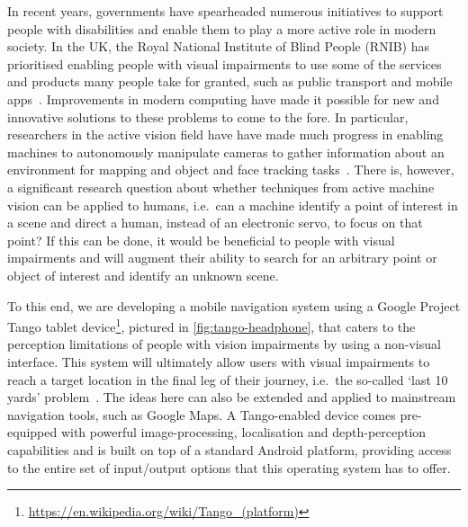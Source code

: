 \documentclass{llncs}
\begin{document}
In recent years, governments have spearheaded numerous initiatives to support people with disabilities and enable them to play a more active role in modern society.
In the UK, the Royal National Institute of Blind People (RNIB) has prioritised enabling people with visual impairments to use some of the services and products many people take for granted, such as public transport and mobile apps~\cite{rnib-objectives}.
Improvements in modern computing have made it possible for new and innovative solutions to these problems to come to the fore.
In particular, researchers in the active vision field have have made much progress in enabling machines to autonomously manipulate cameras to gather information about an environment for mapping and object and face tracking tasks~\cite{bajcsy2018revisiting}.
There is, however, a significant research question about whether techniques from active machine vision can be applied to humans, i.e.\ can a machine identify a point of interest in a scene and direct a human, instead of an electronic servo, to focus on that point?
If this can be done, it would be beneficial to people with visual impairments and will augment their ability to search for an arbitrary point or object of interest and identify an unknown scene. 

To this end, we are developing a mobile navigation system using a Google Project Tango tablet device\footnote{\url{https://en.wikipedia.org/wiki/Tango\_(platform)}}, pictured in \cref{fig:tango-headphone}, that caters to the perception limitations of people with vision impairments by using a non-visual interface.
This system will ultimately allow users with visual impairments to reach a target location in the final leg of their journey, i.e.\ the so-called `last 10 yards' problem~\cite{google2016blind,bellotto2013}. 
The ideas here can also be extended and applied to mainstream navigation tools, such as Google Maps.
A Tango-enabled device comes pre-equipped with powerful image-processing, localisation and depth-perception capabilities and is built on top of a standard Android platform, providing access to the entire set of input/output options that this operating system has to offer.
\end{document}
